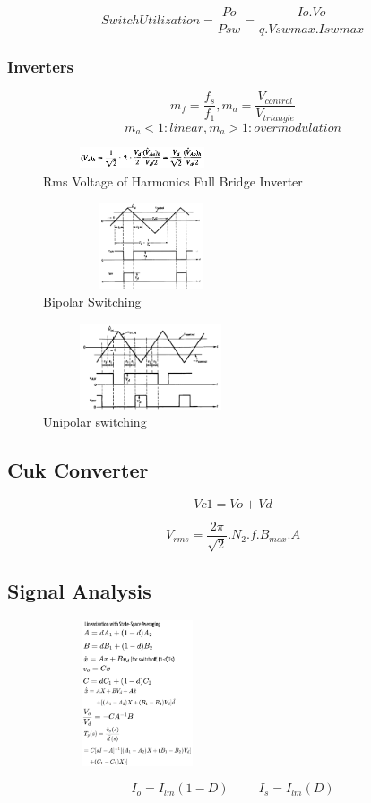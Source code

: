 \documentclass[twocolumn, ]{article}
\begin{document}
\begin{equation}
Switch Utilization= \frac{Po}{Psw}=\frac{Io.Vo}{q.Vswmax.Iswmax}
\end{equation}

\subsubsection*{Inverters}

$$ m_f=\dfrac{f_s}{f_1}, m_a=\dfrac{V_{control}}{V_{triangle}}$$
$$m_a<1: linear, m_a>1: overmodulation$$

\begin{figure}[!ht]
	\includegraphics[width=2.3in,height=0.25in]{RmsVoltageofHarmonicsFullBridgeInverter.png}
	\caption{Rms Voltage of Harmonics Full Bridge Inverter}
\end{figure}
\begin{figure}[!ht]
	\includegraphics[width=2.5in,height=1in]{bipolar1.png}
	\caption{Bipolar Switching}
\end{figure}
\begin{figure}[!ht]
	\includegraphics[width=2.5in,height=1in]{unipolar1.png}
	\caption{Unipolar switching}
\end{figure}
\subsection*{\small Cuk Converter}
\small
\begin{equation}
Vc1=Vo+Vd
\end{equation}





\begin{equation}
V_{rms}=\frac{2\pi}{\sqrt{2}}.N_{2}.f.B_{max}.A
\end{equation}

\subsection*{\small Signal Analysis}
 \begin{figure}[!ht]
	\includegraphics[width=2.2in,height=1.7in]{Small Signal.png}
\end{figure}
\begin{equation*}
I_{o}=I_{lm}(1-D) 
\hspace{1cm}
I_{s}=I_{lm}(D)
\end{equation*}
\end{document}
